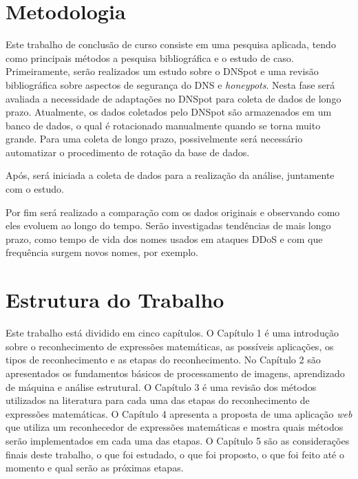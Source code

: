 \section{Metodologia}
\label{sec:solucao}

Este trabalho de conclusão de curso consiste em uma pesquisa aplicada, tendo como principais métodos a pesquisa bibliográfica e o estudo de caso. Primeiramente, serão realizados um estudo sobre o DNSpot e uma revisão bibliográfica sobre aspectos de segurança do DNS e \textit{honeypots}. Nesta fase será avaliada a necessidade de adaptações no DNSpot para coleta de dados de longo prazo. Atualmente, os dados coletados pelo DNSpot são armazenados em um banco de dados, o qual é rotacionado manualmente quando se torna muito grande. Para uma coleta de longo prazo, possivelmente será necessário automatizar o procedimento de rotação da base de dados.

\iffalse
Para a realização da análise evolucional dos dados, será necessário realizar uma pesquisa aplicada buscando um aprofundamento nos conceitos e funcionalidades do \iffalse Primeiramente, serão realizados um estudo sobre o\fi DNSpot e uma revisão
bibliográfica sobre aspectos de segurança do DNS e
\textit{honeypots}. Nesta fase será avaliada a necessidade de
adaptações no DNSpot para coleta de dados de longo prazo. 
\fi 

Após, será iniciada a coleta de dados para a realização da análise, juntamente com o estudo. 

Por fim será realizado a comparação com os dados originais
\cite{Longo:2015:tcc} e observando como eles evoluem ao longo do
tempo. Serão investigadas tendências de mais longo prazo, 
como tempo de vida dos nomes usados em ataques DDoS e com que
frequência surgem novos nomes, por exemplo.



\section{Estrutura do Trabalho}
\label{sec:escopo}

Este trabalho está dividido em cinco capítulos. O Capítulo 1 é uma introdução sobre o reconhecimento de expressões matemáticas, as possíveis aplicações, os tipos de reconhecimento e as etapas do reconhecimento. No Capítulo 2 são apresentados os fundamentos básicos de processamento de imagens, aprendizado de máquina e análise estrutural. O Capítulo 3 é uma revisão dos métodos utilizados na literatura para cada uma das etapas do reconhecimento de expressões matemáticas. O Capítulo 4 apresenta a proposta de uma aplicação \textit{web} que utiliza um reconhecedor de expressões matemáticas e mostra quais métodos serão implementados em cada uma das etapas. O Capítulo 5 são as considerações finais deste trabalho, o que foi estudado, o que foi proposto, o que foi feito até o momento e qual serão as próximas etapas.
